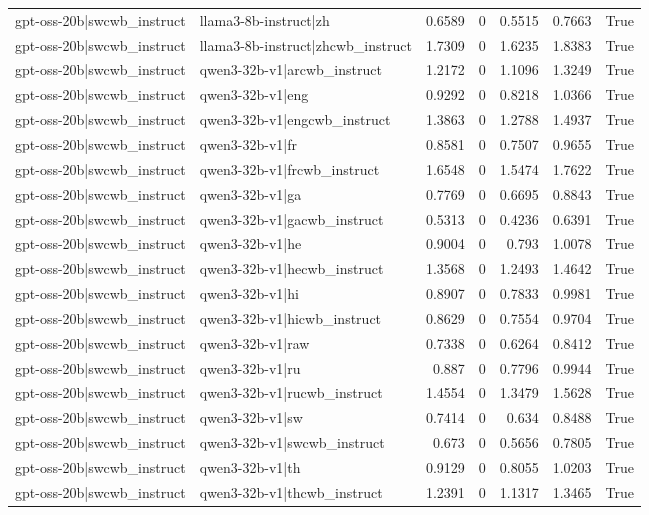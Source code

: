\begin{table}
\begin{tabular}{l l r r r r l}
gpt-oss-20b|swcwb_instruct & llama3-8b-instruct|zh & 0.6589 & 0 & 0.5515 & 0.7663 & True \\
gpt-oss-20b|swcwb_instruct & llama3-8b-instruct|zhcwb_instruct & 1.7309 & 0 & 1.6235 & 1.8383 & True \\
gpt-oss-20b|swcwb_instruct & qwen3-32b-v1|arcwb_instruct & 1.2172 & 0 & 1.1096 & 1.3249 & True \\
gpt-oss-20b|swcwb_instruct & qwen3-32b-v1|eng & 0.9292 & 0 & 0.8218 & 1.0366 & True \\
gpt-oss-20b|swcwb_instruct & qwen3-32b-v1|engcwb_instruct & 1.3863 & 0 & 1.2788 & 1.4937 & True \\
gpt-oss-20b|swcwb_instruct & qwen3-32b-v1|fr & 0.8581 & 0 & 0.7507 & 0.9655 & True \\
gpt-oss-20b|swcwb_instruct & qwen3-32b-v1|frcwb_instruct & 1.6548 & 0 & 1.5474 & 1.7622 & True \\
gpt-oss-20b|swcwb_instruct & qwen3-32b-v1|ga & 0.7769 & 0 & 0.6695 & 0.8843 & True \\
gpt-oss-20b|swcwb_instruct & qwen3-32b-v1|gacwb_instruct & 0.5313 & 0 & 0.4236 & 0.6391 & True \\
gpt-oss-20b|swcwb_instruct & qwen3-32b-v1|he & 0.9004 & 0 & 0.793 & 1.0078 & True \\
gpt-oss-20b|swcwb_instruct & qwen3-32b-v1|hecwb_instruct & 1.3568 & 0 & 1.2493 & 1.4642 & True \\
gpt-oss-20b|swcwb_instruct & qwen3-32b-v1|hi & 0.8907 & 0 & 0.7833 & 0.9981 & True \\
gpt-oss-20b|swcwb_instruct & qwen3-32b-v1|hicwb_instruct & 0.8629 & 0 & 0.7554 & 0.9704 & True \\
gpt-oss-20b|swcwb_instruct & qwen3-32b-v1|raw & 0.7338 & 0 & 0.6264 & 0.8412 & True \\
gpt-oss-20b|swcwb_instruct & qwen3-32b-v1|ru & 0.887 & 0 & 0.7796 & 0.9944 & True \\
gpt-oss-20b|swcwb_instruct & qwen3-32b-v1|rucwb_instruct & 1.4554 & 0 & 1.3479 & 1.5628 & True \\
gpt-oss-20b|swcwb_instruct & qwen3-32b-v1|sw & 0.7414 & 0 & 0.634 & 0.8488 & True \\
gpt-oss-20b|swcwb_instruct & qwen3-32b-v1|swcwb_instruct & 0.673 & 0 & 0.5656 & 0.7805 & True \\
gpt-oss-20b|swcwb_instruct & qwen3-32b-v1|th & 0.9129 & 0 & 0.8055 & 1.0203 & True \\
gpt-oss-20b|swcwb_instruct & qwen3-32b-v1|thcwb_instruct & 1.2391 & 0 & 1.1317 & 1.3465 & True \\

\end{tabular}
\end{table}
